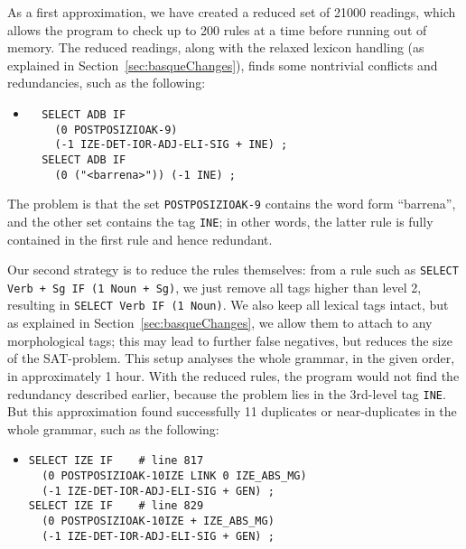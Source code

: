 {{As a first approximation, we have created a reduced set of 21000
readings, which allows the program to check up to 200 rules at a time
before running out of memory. The reduced readings, along with the
relaxed lexicon handling (as explained in
Section~\ref{sec:basqueChanges}), finds some nontrivial conflicts and
redundancies, such as the following:

\begin{itemize}
\item[]
\begin{verbatim}
  SELECT ADB IF
    (0 POSTPOSIZIOAK-9)
    (-1 IZE-DET-IOR-ADJ-ELI-SIG + INE) ;
  SELECT ADB IF
    (0 ("<barrena>")) (-1 INE) ;
\end{verbatim}
\end{itemize}

\noindent The problem is that the set \texttt{POSTPOSIZIOAK-9}
contains the word form ``barrena'', and the other set contains the tag
\texttt{INE}; in other words, the latter rule is fully contained in
the first rule and hence redundant.


Our second strategy is to reduce the rules themselves: from a rule
such as \texttt{SELECT Verb + Sg IF (1 Noun + Sg)}, we just remove all
tags higher than level 2, resulting in \texttt{SELECT Verb IF (1
  Noun)}. We also keep all lexical tags intact, but as explained in
Section~\ref{sec:basqueChanges}, we allow them to attach to any
morphological tags; this may lead to further false negatives, but
reduces the size of the SAT-problem.  This setup analyses the whole
grammar, in the given order, in approximately 1 hour.  With the
reduced rules, the program would not find the redundancy described
earlier, because the problem lies in the 3rd-level tag
\texttt{INE}. But this approximation found successfully 11 duplicates
or near-duplicates in the whole grammar, such as the following:

\begin{itemize}
\item[]
\begin{verbatim}
SELECT IZE IF 	 # line 817
  (0 POSTPOSIZIOAK-10IZE LINK 0 IZE_ABS_MG)
  (-1 IZE-DET-IOR-ADJ-ELI-SIG + GEN) ;
SELECT IZE IF 	 # line 829
  (0 POSTPOSIZIOAK-10IZE + IZE_ABS_MG)
  (-1 IZE-DET-IOR-ADJ-ELI-SIG + GEN) ;
\end{verbatim}
\end{itemize}

}}
